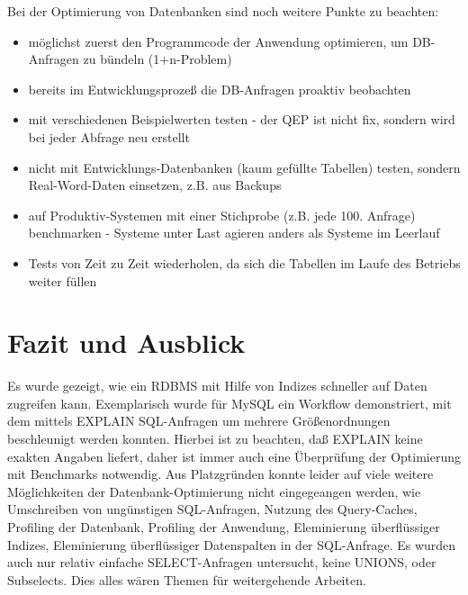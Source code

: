 Bei der Optimierung von Datenbanken sind noch weitere Punkte zu beachten:
\begin{itemize} 
	\item möglichst zuerst den Programmcode der Anwendung optimieren, um DB-Anfragen zu bündeln (1+n-Problem)
	\item bereits im Entwicklungsprozeß die DB-Anfragen proaktiv beobachten
	\item mit verschiedenen Beispielwerten testen - der QEP ist nicht fix, sondern wird bei jeder Abfrage neu erstellt
	\item nicht mit Entwicklungs-Datenbanken (kaum gefüllte Tabellen) testen, sondern Real-Word-Daten einsetzen, z.B. aus Backups
	\item auf Produktiv-Systemen mit einer Stichprobe (z.B. jede 100. Anfrage) benchmarken - Systeme unter Last agieren anders als Systeme im Leerlauf
	\item Tests von Zeit zu Zeit wiederholen, da sich die Tabellen im Laufe des Betriebs weiter füllen
\end{itemize}

\section{Fazit und Ausblick}

Es wurde gezeigt, wie ein RDBMS mit Hilfe von Indizes schneller auf Daten zugreifen kann.
Exemplarisch wurde für MySQL ein Workflow demonstriert, mit dem mittels EXPLAIN SQL-Anfragen um mehrere Größenordnungen beschleunigt werden konnten.
Hierbei ist zu beachten, daß EXPLAIN keine exakten Angaben liefert, daher ist immer auch eine Überprüfung der Optimierung mit Benchmarks notwendig.
Aus Platzgründen konnte leider auf viele weitere Möglichkeiten der Datenbank-Optimierung nicht eingegeangen werden, wie Umschreiben von ungünstigen SQL-Anfragen, Nutzung des Query-Caches, Profiling der Datenbank, Profiling der Anwendung, Eleminierung überflüssiger Indizes, Eleminierung überflüssiger Datenspalten in der SQL-Anfrage. 
Es wurden auch nur relativ einfache SELECT-Anfragen untersucht, keine UNIONS, oder Subselects.
Dies alles wären Themen für weitergehende Arbeiten. 

